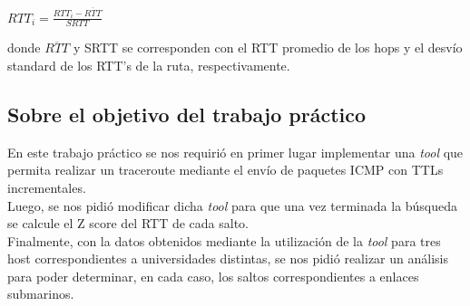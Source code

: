 \begin{center}\Large \itshape
$RTT_i = \frac{RTT_i - \overline{RTT}}{SRTT}$ \newline
\end{center}

\indent \indent donde $\overline{RTT}$ y SRTT se corresponden con el RTT promedio de los hops y el desvío standard de los RTT's de la ruta, respectivamente.\\

\subsection{Sobre el objetivo del trabajo práctico}

\indent \indent En este trabajo práctico se nos requirió en primer lugar implementar una \textit{tool} que permita realizar un traceroute mediante el envío de paquetes ICMP con TTLs incrementales.\\
\indent Luego, se nos pidió modificar dicha \textit{tool} para que una vez terminada la búsqueda se calcule el Z score del RTT de cada salto.\\
\indent Finalmente, con la datos obtenidos mediante la utilización de la \textit{tool} para tres host correspondientes a universidades distintas, se nos pidió realizar un análisis para poder determinar, en cada caso, los saltos correspondientes a enlaces submarinos.\\
 
